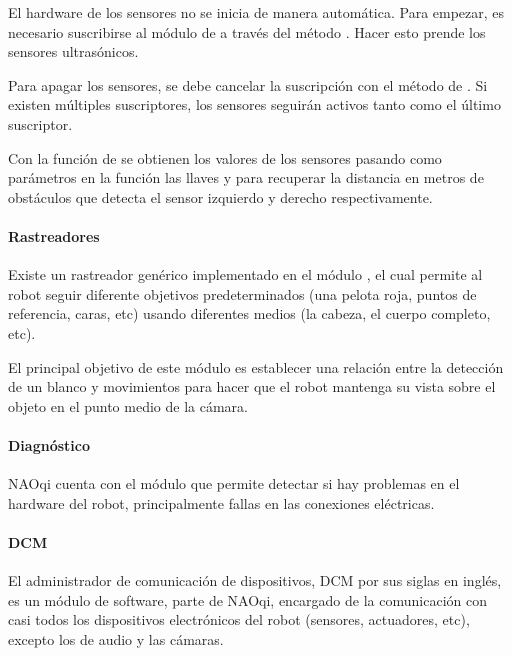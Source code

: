 El hardware de los sensores no se inicia de manera automática. Para empezar,
es necesario suscribirse al módulo de  a través del método .
Hacer esto prende los sensores ultrasónicos.

Para apagar los sensores, se debe cancelar la suscripción con el método
 de . Si existen múltiples suscriptores,
los sensores seguirán activos tanto como el último suscriptor.

Con la función  de  se obtienen los valores de los sensores
pasando como parámetros en la función las llaves
 y
 para recuperar la distancia
en metros de obstáculos que detecta el sensor izquierdo y derecho
respectivamente.


\paragraph{Rastreadores}
\label{\detokenize{chapter_one/naoqi:rastreadores}}
Existe un rastreador genérico implementado en el módulo , el cual
permite al robot seguir diferente objetivos predeterminados (una pelota roja,
puntos de referencia, caras, etc) usando diferentes medios (la cabeza, el
cuerpo completo, etc).

El principal objetivo de este módulo es establecer una relación entre la
detección de un blanco y movimientos para hacer que el robot mantenga
su vista sobre el objeto en el punto medio de la cámara.


\paragraph{Diagnóstico}
\label{\detokenize{chapter_one/naoqi:diagnostico}}
NAOqi cuenta con el módulo   que permite detectar si hay
problemas en el hardware del robot, principalmente fallas en las conexiones eléctricas.


\paragraph{DCM}
\label{\detokenize{chapter_one/naoqi:dcm}}
El administrador de comunicación de dispositivos, DCM por sus siglas en inglés,
es un módulo de software, parte de NAOqi, encargado de la comunicación con
casi todos los dispositivos electrónicos del robot (sensores, actuadores, etc),
excepto los de audio y las cámaras.


